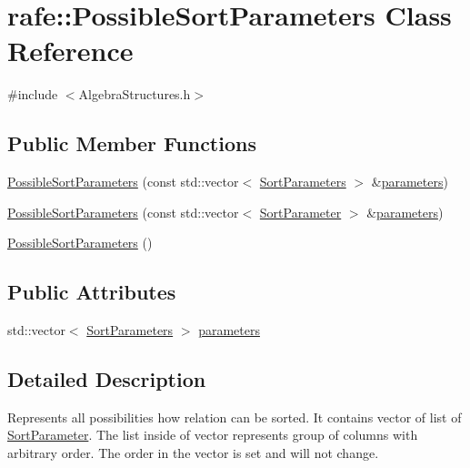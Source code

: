 \hypertarget{classrafe_1_1_possible_sort_parameters}{\section{rafe\+:\+:Possible\+Sort\+Parameters Class Reference}
\label{classrafe_1_1_possible_sort_parameters}
}


{\ttfamily \#include $<$Algebra\+Structures.\+h$>$}

\subsection*{Public Member Functions}
\begin{DoxyCompactItemize}
\item 
\hyperlink{classrafe_1_1_possible_sort_parameters_a33ff31d2f08d8e0026efd87ecaf7e99a}{Possible\+Sort\+Parameters} (const std\+::vector$<$ \hyperlink{classrafe_1_1_sort_parameters}{Sort\+Parameters} $>$ \&\hyperlink{classrafe_1_1_possible_sort_parameters_ace90bc0923cc964b0206542af29a49dc}{parameters})
\item 
\hyperlink{classrafe_1_1_possible_sort_parameters_aa87b5fb0147ef2826671787b28405124}{Possible\+Sort\+Parameters} (const std\+::vector$<$ \hyperlink{classrafe_1_1_sort_parameter}{Sort\+Parameter} $>$ \&\hyperlink{classrafe_1_1_possible_sort_parameters_ace90bc0923cc964b0206542af29a49dc}{parameters})
\item 
\hyperlink{classrafe_1_1_possible_sort_parameters_a082dfcff272f9831451905fcaf3be90e}{Possible\+Sort\+Parameters} ()
\end{DoxyCompactItemize}
\subsection*{Public Attributes}
\begin{DoxyCompactItemize}
\item 
std\+::vector$<$ \hyperlink{classrafe_1_1_sort_parameters}{Sort\+Parameters} $>$ \hyperlink{classrafe_1_1_possible_sort_parameters_ace90bc0923cc964b0206542af29a49dc}{parameters}
\end{DoxyCompactItemize}


\subsection{Detailed Description}
Represents all possibilities how relation can be sorted. It contains vector of list of \hyperlink{classrafe_1_1_sort_parameter}{Sort\+Parameter}. The list inside of vector represents group of columns with arbitrary order. The order in the vector is set and will not change. 

